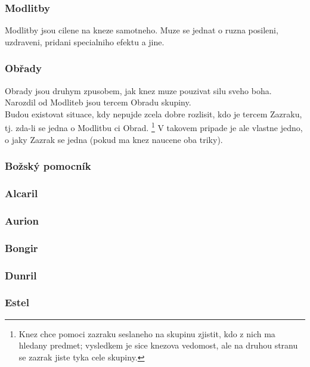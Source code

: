 \documentclass[../main.tex]{subfiles}
\begin{document}
\subsubsection*{Modlitby}
\label{sec:modlitby}
Modlitby jsou  cilene na kneze samotneho. Muze se jednat o ruzna posileni, uzdraveni, pridani specialniho efektu a jine. 

\subsubsection*{Obřady}
\label{sec:obrady}
Obrady jsou druhym zpusobem, jak knez muze pouzivat silu sveho boha. Narozdil od Modliteb jsou tercem Obradu skupiny.\\

Budou existovat situace, kdy nepujde zcela dobre rozlisit, kdo je tercem Zazraku, tj. zda-li se jedna o Modlitbu ci Obrad. \footnote{Knez chce pomoci zazraku seslaneho na skupinu zjistit, kdo z nich ma hledany predmet; vysledkem je sice knezova vedomost, ale na druhou stranu se zazrak jiste tyka cele skupiny.} V takovem pripade je ale vlastne jedno, o jaky Zazrak se jedna (pokud ma knez naucene oba triky).

\subsubsection*{Božský pomocník}
\label{sec:bozsky-pomocnik}

\subsubsection{Alcaril}
\label{sec:alcaril}

\subsubsection{Aurion}
\label{sec:aurion}

\subsubsection{Bongir}
\label{sec:bongir}

\subsubsection{Dunril}
\label{sec:dunril}

\subsubsection{Estel}
\label{sec:estel}
\end{document}
